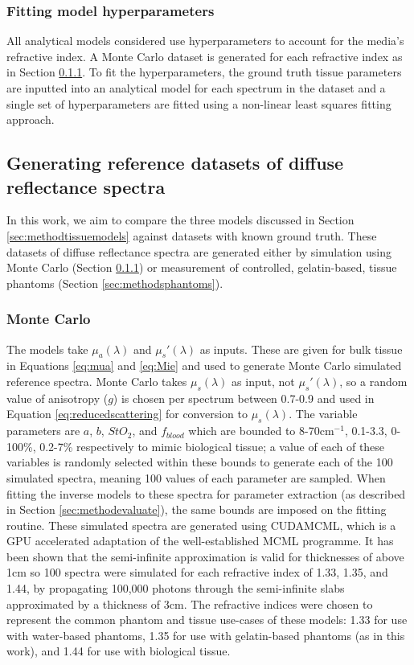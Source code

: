 \subsubsection{Fitting model hyperparameters}
All analytical models considered use hyperparameters to account for the media's refractive index. A Monte Carlo dataset is generated for each refractive index as in Section \ref{sec:methodsMC}. To fit the hyperparameters, the ground truth tissue parameters are inputted into an analytical model for each spectrum in the dataset and a single set of hyperparameters are fitted using a non-linear least squares fitting approach.

\subsection{Generating reference datasets of diffuse reflectance spectra}\label{sec:methodreference}
In this work, we aim to compare the three models discussed in Section \ref{sec:methodtissuemodels} against datasets with known ground truth. These datasets of diffuse reflectance spectra are generated either by simulation using Monte Carlo (Section \ref{sec:methodsMC}) or measurement of controlled, gelatin-based, tissue phantoms (Section \ref{sec:methodsphantoms}).

\subsubsection{Monte Carlo}\label{sec:methodsMC}
The models take $\mu_a(\lambda)$ and $\mu_s'(\lambda)$ as inputs. These are given for bulk tissue in Equations \eqref{eq:mua} and \eqref{eq:Mie} and used to generate Monte Carlo simulated reference spectra. Monte Carlo takes $\mu_s(\lambda)$ as input, not $\mu_s'(\lambda)$, so a random value of anisotropy ($g$) is chosen per spectrum between 0.7-0.9\cite{Yudovsky2009} and used in Equation \eqref{eq:reducedscattering} for conversion to $\mu_s(\lambda)$. The variable parameters are $a$, $b$, $StO_2$, and $f_{blood}$ which are bounded to 8-70cm\textrm{$^{-1}$}, 0.1-3.3, 0-100\%, 0.2-7\% respectively to mimic biological tissue\cite{Yudovsky2009, Jacques2013}; a value of each of these variables is randomly selected within these bounds to generate each of the 100 simulated spectra, meaning 100 values of each parameter are sampled. When fitting the inverse models to these spectra for parameter extraction (as described in Section \ref{sec:methodevaluate}), the same bounds are imposed on the fitting routine. These simulated spectra are generated using CUDAMCML\cite{Alerstam2008}, which is a GPU accelerated adaptation of the well-established MCML programme\cite{Wang1995}. It has been shown that the semi-infinite approximation is valid for thicknesses of above 1cm\cite{Zhang2014} so 100 spectra were simulated for each refractive index of 1.33, 1.35, and 1.44, by propagating 100,000 photons through the semi-infinite slabs approximated by a thickness of 3cm. The refractive indices were chosen to represent the common phantom and tissue use-cases of these models: 1.33 for use with water-based phantoms, 1.35 for use with gelatin-based phantoms (as in this work), and 1.44 for use with biological tissue.


